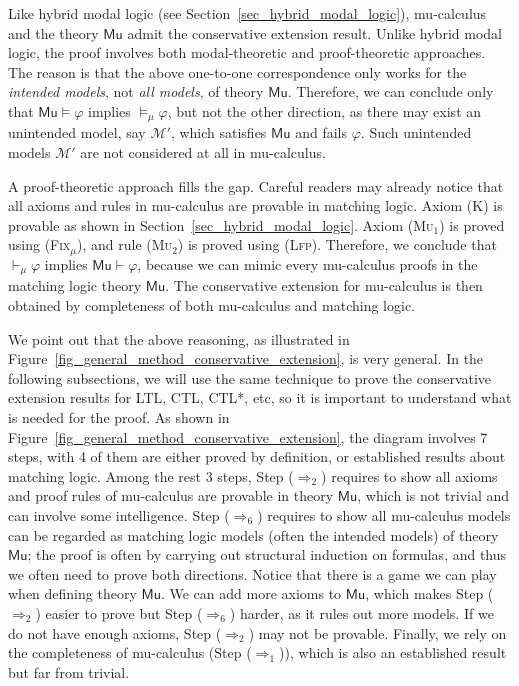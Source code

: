 \documentclass[acmsmall,review,anonymous]{acmart}
\newcommand{\MM}{\mathcal{M}}
\newcommand{\MLMu}{\mathsf{Mu}}
\newcommand{\prule}[1]{\textsc{(#1)}}
\newcommand{\Lfp}{\prule{Lfp}\xspace}
\newcommand{\Fixmu}{\prule{Fix$_\mu$}\xspace}
\begin{document}
Like hybrid modal logic (see Section~\ref{sec_hybrid_modal_logic}), 
mu-calculus and the theory $\MLMu$
admit the conservative extension result.
Unlike hybrid modal logic, the proof involves
both modal-theoretic and proof-theoretic approaches.
The reason is that the above one-to-one correspondence only works for
the \emph{intended models}, not \emph{all models}, of theory $\MLMu$.
Therefore, we can conclude only
that $\MLMu \vDash \varphi$ implies $\vDash_\mu \varphi$,
but not the other direction, as there may exist an unintended model, say $\MM'$,
which satisfies $\MLMu$ and fails $\varphi$.
Such unintended models $\MM'$ are not considered at all in mu-calculus.

A proof-theoretic approach fills the gap.
Careful readers may already notice that 
all axioms and rules in mu-calculus are provable in matching logic.
Axiom \prule{K} is provable as shown in Section~\ref{sec_hybrid_modal_logic}.
Axiom \prule{Mu$_1$} is proved using \Fixmu,
and rule \prule{Mu$_2$} is proved using \Lfp.
Therefore, we conclude that $\vdash_\mu \varphi$ implies $\MLMu \vdash \varphi$,
because we can mimic every mu-calculus proofs in the matching logic theory $\MLMu$.
The conservative extension for mu-calculus is then obtained by 
completeness of both mu-calculus and matching logic.

We point out that the above reasoning,
as illustrated in Figure~\ref{fig_general_method_conservative_extension},
is very general.
In the following subsections, 
we will use the same technique to prove
the conservative extension results for LTL, CTL, CTL*, etc,
so it is important to understand what is needed for the proof.
As shown in Figure~\ref{fig_general_method_conservative_extension},
the diagram involves 7 steps, with 4 of them are either proved by definition,
or established results about matching logic.
Among the rest 3 steps,
Step ($\Longrightarrow_2$) requires to show all axioms and proof rules of mu-calculus
are provable in theory $\MLMu$, 
which is not trivial and can involve some intelligence.
Step ($\Longrightarrow_6$) requires to show all mu-calculus models can be regarded as
matching logic models (often the intended models) of theory $\MLMu$;
the proof is often by carrying out structural induction on formulas,
and thus we often need to prove both directions.
Notice that there is a game we can play when defining theory $\MLMu$.
We can add more axioms to $\MLMu$, which makes Step ($\Longrightarrow_2$) easier to prove
but Step ($\Longrightarrow_6$) harder, as it rules out more models.
If we do not have enough axioms, Step ($\Longrightarrow_2$) may not be provable.
Finally, we rely on the completeness of mu-calculus (Step ($\Longrightarrow_1$)),
which is also an established result but far from trivial.
\end{document}
